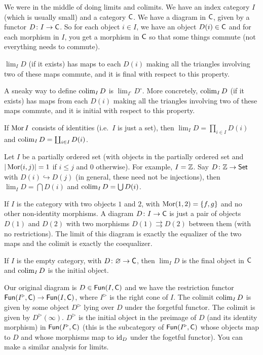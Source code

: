 
We were in the middle of doing limits and colimits. We have an index category $I$ (which is usually small) and a category $\text{\sf C}$. We have a diagram in $\text{\sf C}$, given by a functor $D\colon I\to \text{\sf C}$. So for each object $i\in I$, we have an object $D(i)\in \text{\sf C}$ and for each morphism in $I$, you get a morphism in $\text{\sf C}$ so that some things commute (not everything needs to commute).

$\lim_I D$ (if it exists) has maps to each $D(i)$ making all the triangles involving two of these maps commute, and it is final with respect to this property.

A sneaky way to define $\operatorname{colim}_I D$ is $\lim_{I^\circ} D^\circ$. More concretely, $\operatorname{colim}_I D$ (if it exists) has maps from each $D(i)$ making all the triangles involving two of these maps commute, and it is initial with respect to this property.
\begin{example}
 If $\operatorname{Mor} I$ consists of identities (i.e.~$I$ is just a set), then $\lim_I D=\prod_{i\in I} D(i)$ and $\operatorname{colim}_I D=\coprod_{i\in I} D(i)$.
\end{example}
\begin{example}
 Let $I$ be a partially ordered set (with objects in the partially ordered set and $|\operatorname{Mor}(i,j)|=1$ if $i\le j$ and 0 otherwise). For example, $I=\mathbb{Z}$. Say $D\colon \mathbb{Z}\to \operatorname{\sf Set}$ with $D(i)\hookrightarrow D(j)$ (in general, these need not be injections), then $\lim_I D=\bigcap D(i)$ and $\operatorname{colim}_I D=\bigcup D(i)$.
\end{example}
\begin{example}
 If $I$ is the category with two objects $1$ and $2$, with $\operatorname{Mor}(1,2)=\{f,g\}$ and no other non-identity morphisms. A diagram $D\colon I\to \text{\sf C}$ is just a pair of objects $D(1)$ and $D(2)$ with two morphisms $D(1)\rightrightarrows D(2)$ between them (with no restrictions). The limit of this diagram is exactly the equalizer of the two maps and the colimit is exactly the coequalizer.
\end{example}
\begin{example}
 If $I$ is the empty category, with $D\colon \varnothing \to \text{\sf C}$, then $\lim_I D$ is the final object in $\text{\sf C}$ and $\operatorname{colim}_I D$ is the initial object.
\end{example}
Our original diagram is $D\in \text{\sf Fun}(I,\text{\sf C})$ and we have the restriction functor $\text{\sf Fun}(I^\triangleright, \text{\sf C})\to \text{\sf Fun}(I,\text{\sf C})$, where $I^\triangleright$ is the right cone of $I$. The colimit $\operatorname{colim}_I D$ is given by some object $D^\triangleright$ lying over $D$ under the forgetful functor. The colimit is given by $D^\triangleright(\infty)$. $D^\triangleright$ is the initial object in the preimage of $D$ (and its identity morphism) in $\text{\sf Fun}(I^\triangleright,\text{\sf C})$ (this is the subcategory of $\text{\sf Fun}(I^\triangleright,\text{\sf C})$ whose objects map to $D$ and whose morphisms map to $\operatorname{id}_D$ under the fogetful functor). You can make a similar analysis for limits.

